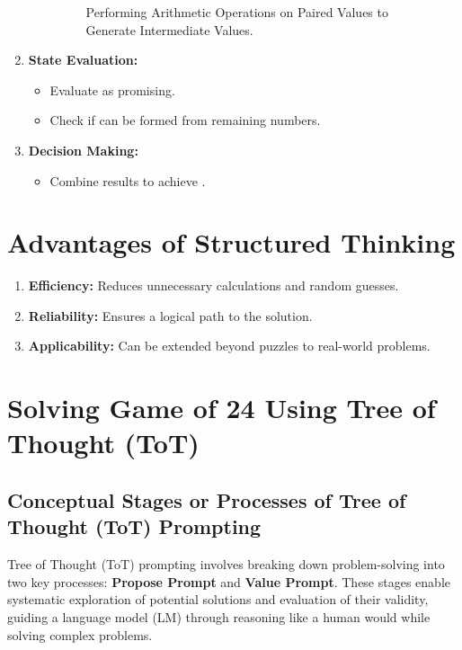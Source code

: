 \documentclass[12pt, a4paper]{article}
\begin{document}
\begin{enumerate}
\begin{itemize}
\begin{figure}[H]
    \caption{Performing Arithmetic Operations on Paired Values to Generate Intermediate Values.}
    \label{fig:Generating Intermediate Values}
\end{figure}
    \end{itemize}
    \item \textbf{State Evaluation:}\begin{itemize}
        \item Evaluate  as promising.
        \item Check if  can be formed from remaining numbers.
    \end{itemize}
    \item \textbf{Decision Making:}
    \begin{itemize}
        \item Combine results to achieve .
    \end{itemize}
    
\end{enumerate}
\section{Advantages of Structured Thinking}
\begin{enumerate}
    \item \textbf{Efficiency: }Reduces unnecessary calculations and random guesses.
    \item \textbf{Reliability: }Ensures a logical path to the solution.
    \item \textbf{Applicability: }Can be extended beyond puzzles to real-world problems.
\end{enumerate}


\section{Solving Game of 24 Using Tree of Thought (ToT)}

\bigskip

\subsection{Conceptual Stages or Processes of Tree of Thought (ToT) Prompting}

Tree of Thought (ToT) prompting involves breaking down problem-solving into two key processes: \textbf{Propose Prompt} and \textbf{Value Prompt}. These stages enable systematic exploration of potential solutions and evaluation of their validity, guiding a language model (LM) through reasoning like a human would while solving complex problems.
\end{document}
